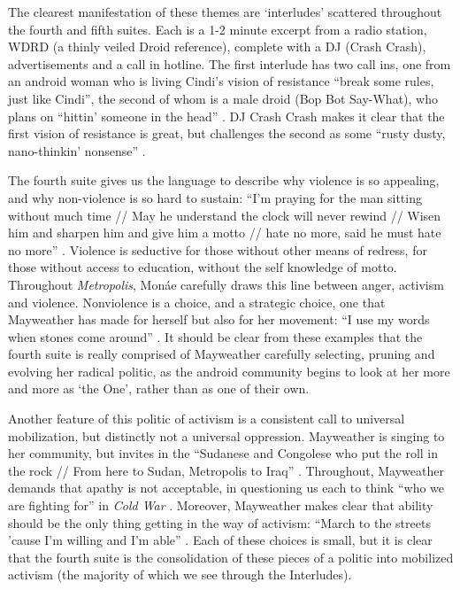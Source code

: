 \documentclass[a4paper, 11pt]{article} %
\begin{document}
The clearest manifestation of these themes are `interludes' scattered throughout the fourth and fifth suites.
Each is a 1-2 minute excerpt from a radio station, WDRD (a thinly veiled Droid reference), complete with a DJ (Crash Crash), advertisements and a call in hotline.
The first interlude has two call ins, one from an android woman who is living Cindi's vision of resistance ``break some rules, just like Cindi'', the second of whom is a male droid (Bop Bot Say-What), who plans on ``hittin' someone in the head'' \cite{goodmorningmidnight}.
DJ Crash Crash makes it clear that the first vision of resistance is great, but challenges the second as some ``rusty dusty, nano-thinkin' nonsense'' \cite{goodmorningmidnight}.

The fourth suite gives us the language to describe why violence is so appealing, and why non-violence is so hard to sustain:
``I'm praying for the man sitting without much time // May he understand the clock will never rewind // Wisen him and sharpen him and give him a motto // hate no more, said he must hate no more'' \cite{danceordie}.
Violence is seductive for those without other means of redress, for those without access to education, without the self knowledge of motto.
Throughout \emph{Metropolis}, Mon\'ae carefully draws this line between anger, activism and violence.
Nonviolence is a choice, and a strategic choice, one that Mayweather has made for herself  but also for her movement: ``I use my words when stones come around'' \cite{manymoons}.
It should be clear from these examples that the fourth suite is really comprised of Mayweather carefully selecting, pruning and evolving her radical politic, as the android community begins to look at her more and more as `the One', rather than as one of their own.

Another feature of this politic of activism is a consistent call to universal mobilization, but distinctly not a universal oppression.
Mayweather is singing to her community, but invites in the 
``Sudanese and Congolese who put the roll in the rock // From here to Sudan, Metropolis to Iraq'' \cite{danceordie}.
Throughout, Mayweather demands that apathy is not acceptable, in questioning us each to think ``who we are fighting for'' in \emph{Cold War} \cite{coldwar}.
Moreover, Mayweather makes clear that ability should be the only thing getting in the way of activism: 
``March to the streets 'cause I'm willing and I'm able'' \cite{queen}.
Each of these choices is small, but it is clear that the fourth suite is the consolidation of these pieces of a politic into mobilized activism (the majority of which we see through the Interludes).
\end{document}
